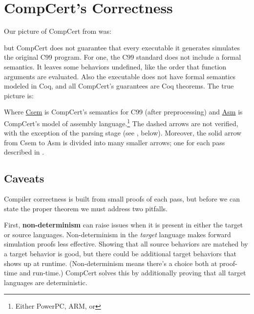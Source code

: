 \section{CompCert's Correctness}
\label{sec:correctness}

Our picture of CompCert from  was:

\begin{center}
\end{center}

but CompCert does not guarantee that every executable it generates simulates the original C99 program.
For one, the C99 standard does not include a formal semantics.
It leaves some behaviors undefined, like the order that function arguments are evaluated.
Also the executable does not have formal semantics modeled in Coq, and all CompCert's guarantees are Coq theorems.
The true picture is:
\begin{center}
\end{center}
Where \href{https://github.com/AbsInt/CompCert/blob/master/cfrontend/Csem.v}{Csem} is CompCert's semantics for C99 (after preprocessing)
 and \href{https://github.com/AbsInt/CompCert/blob/master/ia32/Asm.v}{Asm} is CompCert's model of assembly language.\footnote{Either PowerPC, ARM, or \intel}
The dashed arrows are not verified, with the exception of the parsing stage (see , below).
Moreover, the solid arrow from Csem to Asm is divided into many smaller arrows; one for each pass described in .

\subsection{Caveats}
Compiler correctness is built from small proofs of each pass, but before we can state the proper theorem we must address two pitfalls.

First, {\bf non-determinism} can raise issues when it is present in either the target or source languages.
Non-determinism in the \emph{target} language makes forward simulation proofs less effective.
Showing that all source behaviors are matched by a target behavior is good, but there could be additional target behaviors that shows up at runtime.
(Non-determinism means there's a choice both at proof-time and run-time.)
CompCert solves this by additionally proving that all target languages are deterministic.

